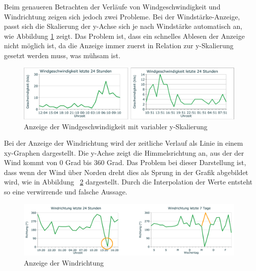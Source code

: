 \noindent
Beim genaueren Betrachten der Verläufe von Windgeschwindigkeit und Windrichtung zeigen sich jedoch zwei Probleme.
Bei der Windstärke-Anzeige, passt sich die Skalierung der y-Achse sich je nach Windstärke automatisch an, wie Abbildung \ref{img:wind-geschw} zeigt. Das Problem ist, dass ein schnelles Ablesen der Anzeige nicht möglich ist, da die Anzeige immer zuerst in Relation zur y-Skalierung gesetzt werden muss, was mühsam ist.


\begin{figure}[h!]
	\centering
	\includegraphics[width=1\linewidth]{img/wind-geschw}
	\caption{Anzeige der Windgeschwindigkeit mit variabler y-Skalierung}
	\label{img:wind-geschw}
\end{figure}

Bei der Anzeige der Windrichtung wird der zeitliche Verlauf als Linie in einem xy-Graphen dargestellt. Die y-Achse zeigt die Himmelsrichtung an, aus der der Wind kommt von 0 Grad bis 360 Grad. Das Problem bei dieser Darstellung ist, dass wenn der Wind über Norden dreht dies als Sprung in der Grafik abgebildet wird, wie in Abbildung~ \ref{img:wind-richtung} dargestellt. Durch die Interpolation der Werte entsteht so eine verwirrende und falsche Aussage.
\newline

\begin{figure}[h!]
	\centering
	\includegraphics[width=1\linewidth]{img/wind-richtung}
	\caption{Anzeige der Windrichtung}
	\label{img:wind-richtung}
\end{figure}

